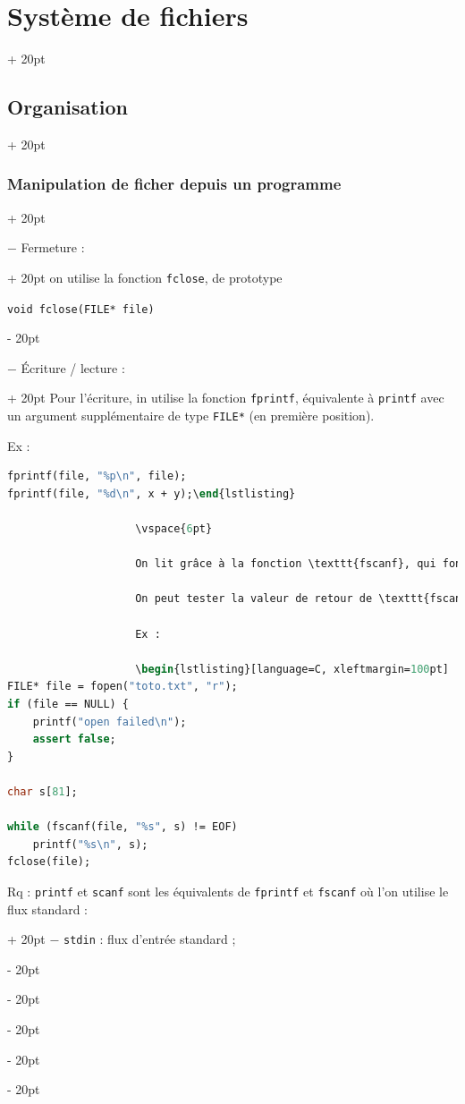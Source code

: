 \documentclass[a4paper, 12pt, twoside]{article}
\newcommand{\ind}[1][20pt]{\advance\leftskip + #1}
\newcommand{\deind}[1][20pt]{\advance\leftskip - #1}
\newenvironment{indentedenv}[1][20pt]{\par \ind[#1]}{\par \deind}
\newenvironment{indt}[2][20pt]{#2 \begin{indentedenv}[#1]}{\end{indentedenv}} %
\begin{document}
\begin{indt}{\section{Système de fichiers}}
\begin{indt}{\subsection{Organisation}}
\begin{indt}{\subsubsection{Manipulation de ficher depuis un programme}}
                \vspace{6pt}
                
                \begin{indt}{$-$ Fermeture :}
                    on utilise la fonction \texttt{fclose}, de prototype
                    
                    \texttt{void fclose(FILE* file)}
                \end{indt}
                
                \vspace{6pt}
                
                \begin{indt}{$-$ \'Ecriture / lecture :}
                    Pour l'écriture, in utilise la fonction \texttt{fprintf}, équivalente à \texttt{printf} avec un argument supplémentaire de type \texttt{FILE*} (en première position).
                
                    Ex :
                    
                    \begin{lstlisting}[language=Caml, xleftmargin=100pt]
fprintf(file, "%p\n", file);
fprintf(file, "%d\n", x + y);\end{lstlisting}
                
                    \vspace{6pt}
                    
                    On lit grâce à la fonction \texttt{fscanf}, qui fonctionne comme \texttt{scanf} avec un argument supplémentaire que \texttt{fprintf}.
                    
                    On peut tester la valeur de retour de \texttt{fscanf} pour savoir si on a atteint la fin du fichier (valeur spéciale \texttt{EOF})
                    
                    Ex :
                    
                    \begin{lstlisting}[language=C, xleftmargin=100pt]
FILE* file = fopen("toto.txt", "r");
if (file == NULL) {
    printf("open failed\n");
    assert false;
}

char s[81];

while (fscanf(file, "%s", s) != EOF)
    printf("%s\n", s);
fclose(file);\end{lstlisting}
                    \vspace{6pt}
                    
                    \begin{indt}{Rq : \texttt{printf} et \texttt{scanf} sont les équivalents de \texttt{fprintf} et \texttt{fscanf} où l'on utilise le flux standard :}
                        $-$ \texttt{stdin} : flux d'entrée standard ;
                        

\end{indt}
\end{indt}
\end{indt}
\end{indt}
\end{indt}
\end{document}
